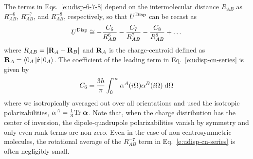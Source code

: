 \documentclass[a4paper,titlepage,twoside,fleqn,12pt]{book}
\newcommand{\BM}[1]{\bm{#1}}
\begin{document}
\begin{refsection}
%
The terms in Eqs.~\eqref{e:udisp-6-7-8} depend on the intermolecular distance 
$R_{AB}$ as $R^{-6}_{AB}$, $R^{-7}_{AB}$, and $R^{-8}_{AB}$, 
respectively, so that $U^{\rm Disp}$ can be recast as
%
\begin{equation} \label{e:udisp-cn-series}
 U^{\rm Disp} \cong -\frac{C_6}{R^{6}_{AB}} -\frac{C_7}{R^{7}_{AB}} -\frac{C_8}{R^{8}_{AB}} + \ldots
\end{equation}
%
where $R_{AB}=\left|{\bf R}_A-{\bf R}_B\right|$ 
and ${\bf R}_A$ is the charge\hyp{}centroid 
defined as ${\bf R}_A=\langle 0_A\left|\hat{\bf r}\right|0_A\rangle$. 
The coefficient of the leading term in Eq.~\eqref{e:udisp-cn-series} is given by
%
\begin{equation} \label{e:c6}
 C_6 = \frac{3\hbar}{\pi} \int_0^\infty \alpha^A(i\Omega) \alpha^B(i\Omega) \;{\rm d}\Omega
\end{equation}
%
where we isotropically averaged out over all orientations and used the 
isotropic polarizabilities, $\alpha^A=\frac{1}{3}{\rm Tr}\;{\BM \alpha}$.
Note that, when the charge distribution has the center of inversion, 
the dipole\hyp{}quadrupole polarizabilities vanish by symmetry 
and only even\hyp{}rank terms are non\hyp{}zero. Even in the case 
of non\hyp{}centrosymmetric molecules, the rotational average 
of the $R^{-7}_{AB}$ term in Eq.~\eqref{e:udisp-cn-series} 
is often negligibly small.\citep{Stone.TheTheoryOfIntermolecularForces.1996}


\end{refsection}
\end{document}
